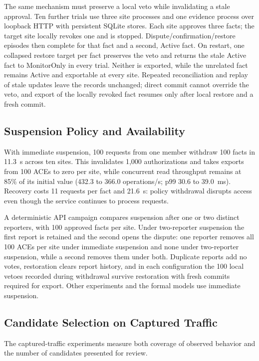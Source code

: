 \documentclass[journal]{IEEEtran}
\theoremstyle{definition}
\begin{document}
The same mechanism must preserve a local veto while invalidating a stale approval. Ten further trials use three site processes and one evidence process over loopback HTTP with persistent SQLite stores. Each site approves three facts; the target site locally revokes one and is stopped. Dispute/confirmation/restore episodes then complete for that fact and a second, Active fact. On restart, one collapsed restore target per fact preserves the veto and returns the stale Active fact to MonitorOnly in every trial. Neither is exported, while the unrelated fact remains Active and exportable at every site. Repeated reconciliation and replay of stale updates leave the records unchanged; direct commit cannot override the veto, and export of the locally revoked fact resumes only after local restore and a fresh commit.

\subsection{Suspension Policy and Availability}
\label{sec:suspension-policy}
With immediate suspension, 100 requests from one member withdraw 100 facts in 11.3~s across ten sites. This invalidates 1,000 authorizations and takes exports from 100 ACEs to zero per site, while concurrent read throughput remains at 85\% of its initial value (432.3 to 366.0 operations/s; p99 30.6 to 39.0~ms). Recovery costs 11 requests per fact and 21.6~s: policy withdrawal disrupts access even though the service continues to process requests.

A deterministic API campaign compares suspension after one or two distinct reporters, with 100 approved facts per site. Under two-reporter suspension the first report is retained and the second opens the dispute: one reporter removes all 100 ACEs per site under immediate suspension and none under two-reporter suspension, while a second removes them under both. Duplicate reports add no votes, restoration clears report history, and in each configuration the 100 local vetoes recorded during withdrawal survive restoration with fresh commits required for export. Other experiments and the formal models use immediate suspension.

\subsection{Candidate Selection on Captured Traffic}
\label{sec:utility-results}
The captured-traffic experiments measure both coverage of observed behavior and the number of candidates presented for review.
\end{document}
